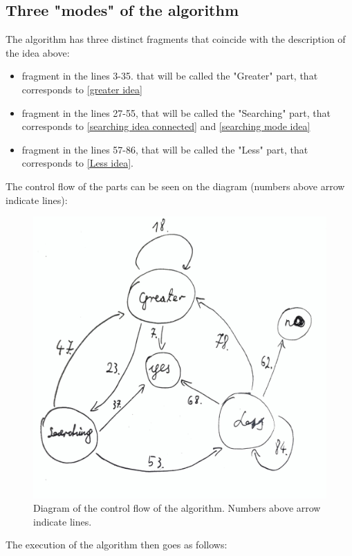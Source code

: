 \subsection{Three "modes" of the algorithm}
The algorithm has three distinct fragments that coincide with 
the description of the idea above: 
\begin{itemize}
\item fragment in the lines 3-35. that will be called the "Greater" part, 
that corresponds to \ref{greater idea}
\item fragment in the lines 27-55, that will be called the "Searching" part, 
that corresponds to \ref{searching idea connected} and \ref{searching mode idea}
\item fragment in the lines 57-86, that will be called the "Less" part, that 
corresponds to \ref{Less idea}.
\end{itemize}

The control flow of the parts can be seen on the diagram (numbers above arrow indicate lines):
\begin{figure}[H]
\centering
\includegraphics[width=\textwidth]{"../searching_for_a_spectrum/control_flow_2.jpg"}
\caption{Diagram of the control flow of the algorithm. Numbers above arrow indicate lines.}
\end{figure}
The execution of the algorithm then goes as follows:

